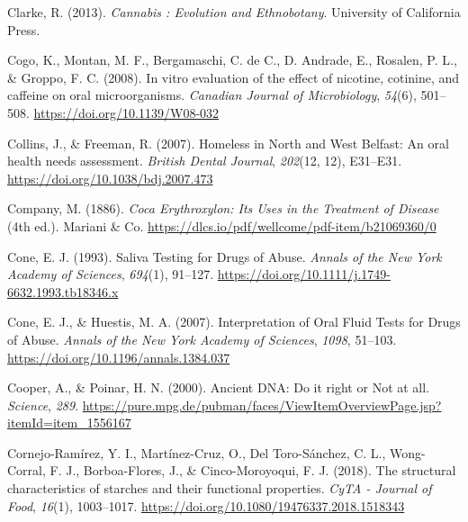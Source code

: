 \documentclass[
  letterpaper,
]{book}
\newlength{\cslhangindent}
\newlength{\cslentryspacingunit} %
\newenvironment{CSLReferences}[2] %
 {%
  \setlength{\parindent}{0pt}
  \ifodd #1
  \let\oldpar\par
  \def\par{\hangindent=\cslhangindent\oldpar}
  \fi
  \setlength{\parskip}{#2\cslentryspacingunit}
 }%
 {}
\begin{document}
\begin{CSLReferences}{1}{0}
\leavevmode{}%
Clarke, R. (2013). \emph{Cannabis : {Evolution} and {Ethnobotany}}.
{University of California Press}.

\leavevmode{}%
Cogo, K., Montan, M. F., Bergamaschi, C. de C., D. Andrade, E., Rosalen,
P. L., \& Groppo, F. C. (2008). In vitro evaluation of the effect of
nicotine, cotinine, and caffeine on oral microorganisms. \emph{Canadian
Journal of Microbiology}, \emph{54}(6), 501--508.
\url{https://doi.org/10.1139/W08-032}

\leavevmode{}%
Collins, J., \& Freeman, R. (2007). Homeless in {North} and {West
Belfast}: An oral health needs assessment. \emph{British Dental
Journal}, \emph{202}(12, 12), E31--E31.
\url{https://doi.org/10.1038/bdj.2007.473}

\leavevmode{}%
Company, M. (1886). \emph{Coca {Erythroxylon}: {Its Uses} in the
{Treatment} of {Disease}} (4th ed.). {Mariani \& Co.}
\url{https://dlcs.io/pdf/wellcome/pdf-item/b21069360/0}

\leavevmode{}%
Cone, E. J. (1993). Saliva {Testing} for {Drugs} of {Abuse}.
\emph{Annals of the New York Academy of Sciences}, \emph{694}(1),
91--127. \url{https://doi.org/10.1111/j.1749-6632.1993.tb18346.x}

\leavevmode{}%
Cone, E. J., \& Huestis, M. A. (2007). Interpretation of {Oral Fluid
Tests} for {Drugs} of {Abuse}. \emph{Annals of the New York Academy of
Sciences}, \emph{1098}, 51--103.
\url{https://doi.org/10.1196/annals.1384.037}

\leavevmode{}%
Cooper, A., \& Poinar, H. N. (2000). Ancient {DNA}: {Do} it right or
{Not} at all. \emph{Science}, \emph{289}.
\url{https://pure.mpg.de/pubman/faces/ViewItemOverviewPage.jsp?itemId=item_1556167}

\leavevmode{}%
Cornejo-Ramírez, Y. I., Martínez-Cruz, O., Del Toro-Sánchez, C. L.,
Wong-Corral, F. J., Borboa-Flores, J., \& Cinco-Moroyoqui, F. J. (2018).
The structural characteristics of starches and their functional
properties. \emph{CyTA - Journal of Food}, \emph{16}(1), 1003--1017.
\url{https://doi.org/10.1080/19476337.2018.1518343}


\end{CSLReferences}
\end{document}

